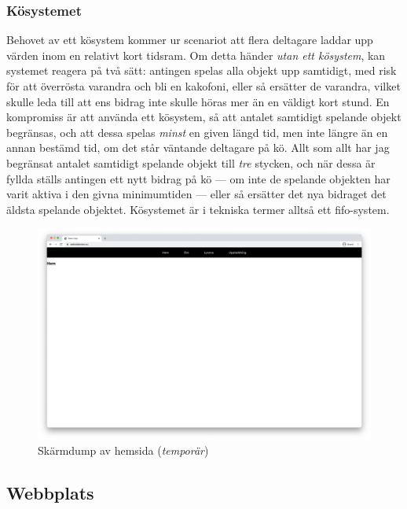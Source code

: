 \documentclass[11pt, a4paper]{article} %
\begin{document}
\subsubsection*{Kösystemet}
Behovet av ett kösystem kommer ur scenariot att flera deltagare laddar upp värden inom en relativt kort tidsram. Om detta händer \emph{utan ett kösystem}, kan systemet reagera på två sätt: antingen spelas alla objekt upp samtidigt, med risk för att överrösta varandra och bli en kakofoni, eller så ersätter de varandra, vilket skulle leda till att ens bidrag inte skulle höras mer än en väldigt kort stund. En kompromiss är att använda ett kösystem, så att antalet samtidigt spelande objekt begränsas, och att dessa spelas \emph{minst} en given längd tid, men inte längre än en annan bestämd tid, om det står väntande deltagare på kö. Allt som allt har jag begränsat antalet samtidigt spelande objekt till \emph{tre} stycken, och när dessa är fyllda ställs antingen ett nytt bidrag på kö --- om inte de spelande objekten har varit aktiva i den givna minimumtiden --- eller så ersätter det nya bidraget det äldsta spelande objektet. Kösystemet är i tekniska termer alltså ett \gls{fifo}-system.

\begin{figure}[ht!]
\centering
\includegraphics[width=\textwidth]{../media/hemsida.png}
\caption{Skärmdump av hemsida (\emph{temporär})}
\label{hemsida}
\end{figure}

\subsection*{Webbplats}
\end{document}
